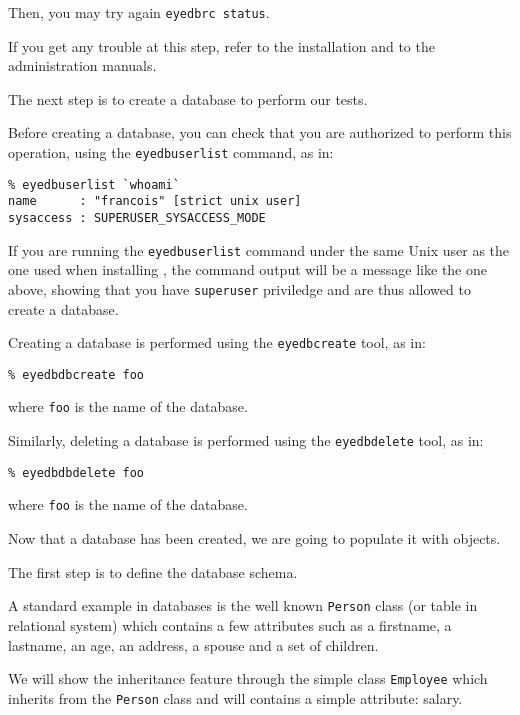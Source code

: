 Then, you may try again \texttt{eyedbrc status}.

If you get any trouble at this step, refer to the installation and to the
administration manuals.



The next step is to create a database to perform our tests.

Before creating a database, you can check that you are authorized to perform this
operation, using the \texttt{eyedbuserlist} command, as in:
\verbsize \begin{verbatim}
% eyedbuserlist `whoami`
name      : "francois" [strict unix user]
sysaccess : SUPERUSER_SYSACCESS_MODE
\end{verbatim}
\normalsize
If you are running the \texttt{eyedbuserlist} command under the same Unix user as the one used when installing \eyedb, the command output will be a message like the one above, showing that you have \texttt{superuser} priviledge and are thus allowed to create a database.

Creating a database is performed using the \texttt{eyedbcreate} tool, as in:
\verbsize
\begin{verbatim}
% eyedbdbcreate foo
\end{verbatim}
where \texttt{foo} is the name of the database.

Similarly, deleting a database is performed using the \texttt{eyedbdelete} tool, as in:
\verbsize
\begin{verbatim}
% eyedbdbdelete foo
\end{verbatim}
where \texttt{foo} is the name of the database.



Now that a database has been created, we are going to populate it with objects.

The first step is to define the database schema.

A standard example in databases is the well known
\texttt{Person} class (or table in relational system) which contains
a few attributes such as a firstname, a lastname, an age, an address, a spouse
and a set of children.

We will show the inheritance feature through the simple class \texttt{Employee}
which inherits from the \texttt{Person} class and will contains a simple
attribute: salary.


